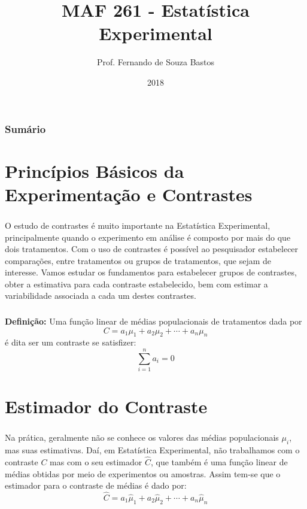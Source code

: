 \documentclass[14pt,aspectratio=1610]{beamer}
\title{MAF 261 - Estatística Experimental}
\author{Prof. Fernando de Souza Bastos}
\institute{Instituto de Ciências Exatas e Tecnológicas\texorpdfstring{\\ Universidade Federal de Viçosa}{}\texorpdfstring{\\ Campus UFV - Florestal}{}}
\date{2018}
\begin{document}


\frame{\titlepage}

\begin{frame}{}
\frametitle{\bf Sumário}
\tableofcontents
\end{frame}

\section{Princípios Básicos da Experimentação e Contrastes}
\begin{frame}{}
\frametitle{}
\begin{block}{}
\justifying
O estudo de contrastes é muito importante na Estatística Experimental, principalmente quando o experimento em análise é composto por mais do que dois tratamentos. Com o uso de contrastes é possível ao pesquisador estabelecer comparações, entre tratamentos ou grupos de tratamentos, que sejam de interesse. Vamos estudar os fundamentos para estabelecer grupos de contrastes, obter a estimativa para cada contraste estabelecido, bem com estimar a variabilidade associada a cada um destes contrastes. 
\end{block}
\end{frame}

\begin{frame}{}
\frametitle{}
\begin{block}{}
\justifying
 {\bf Definição:} Uma função linear de médias populacionais de tratamentos dada por $$C=a_{1}\mu_{1}+a_{2}\mu_{2}+\cdots+a_{n}\mu_{n}$$ é dita ser um contraste se satisfizer:
$${\displaystyle \sum_{i=1}^{n}a_{i}=0}$$ 
\end{block}
\end{frame}

\section{Estimador do Contraste}
\begin{frame}{}
\frametitle{}
\begin{block}{}
\justifying
Na prática, geralmente não se conhece os valores das médias populacionais $\mu_{i}$,
mas suas estimativas. Daí, em Estatística Experimental, não trabalhamos com o contraste
$C$ mas com o seu estimador $\hat{C}$, que também é uma função linear de médias obtidas por meio de experimentos ou amostras. Assim tem-se que o estimador para o contraste de
médias é dado por: 
$$\hat{C}=a_{1}\hat{\mu}_{1}+a_{2}\hat{\mu}_{2}+\cdots+a_{n}\hat{\mu}_{n}$$
\end{block}
\end{frame}
\end{document}
